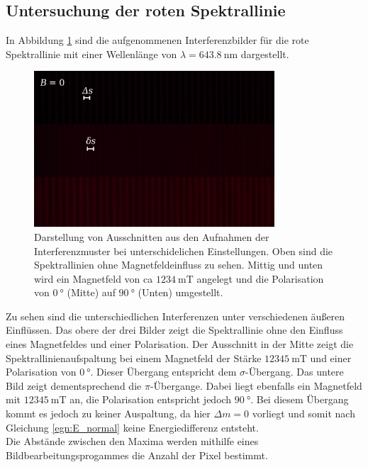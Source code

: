  \subsection{Untersuchung der roten Spektrallinie}
 In Abbildung \ref{fig:rot} sind die aufgenommenen Interferenzbilder für die rote Spektrallinie 
 mit einer Wellenlänge von $\lambda = \SI{643.8}{\nano\meter}$ dargestellt.
 \begin{figure}[H]
     \centering
     \includegraphics[width=0.8\textwidth]{../images/zebraplot_rot.jpg}
     \caption{Darstellung von Ausschnitten aus den Aufnahmen der Interferenzmuster bei unterschidelichen 
     Einstellungen. Oben sind die Spektrallinien ohne Magnetfeldeinfluss zu sehen. Mittig und unten 
     wird ein Magnetfeld von ca $\SI{1234}{\milli\tesla}$ angelegt und die Polarisation von $\SI{0}{\degree}$ (Mitte)
     auf $\SI{90}{\degree}$ (Unten) umgestellt.}
     \label{fig:rot}
 \end{figure} \noindent
 Zu sehen sind die unterschiedlichen Interferenzen unter verschiedenen äußeren Einflüssen. Das obere der drei
 Bilder zeigt die Spektrallinie ohne den Einfluss eines Magnetfeldes und einer Polarisation. Der Ausschnitt in
 der Mitte zeigt die Spektrallinienaufspaltung bei einem Magnetfeld der Stärke $\SI{12345}{\milli\tesla}$ und 
 einer Polarisation von $\SI{0}{\degree}$. Dieser Übergang entspricht dem $\sigma$-Übergang. Das untere 
 Bild zeigt dementsprechend die $\pi$-Übergange. Dabei liegt ebenfalls ein Magnetfeld mit $\SI{12345}{\milli\tesla}$
 an, die Polarisation entspricht jedoch $\SI{90}{\degree}$. Bei diesem Übergang kommt es jedoch zu keiner 
 Auspaltung, da hier $\Delta m = 0$ vorliegt und somit nach Gleichung \ref{egn:E_normal} keine Energiedifferenz 
 entsteht. \\
 Die Abstände zwischen den Maxima werden mithilfe eines Bildbearbeitungsprogammes die Anzahl der Pixel bestimmt. 
